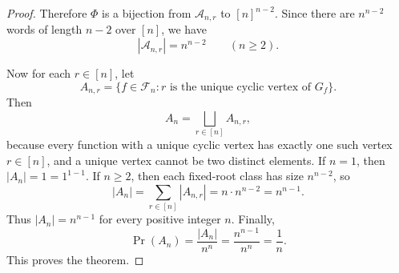 \documentclass[11pt]{article}
\begin{document}
\begin{proof}
Therefore \(\Phi\) is a bijection from \(\mathcal A_{n,r}\) to \([n]^{n-2}\).
Since there are \(n^{n-2}\) words of length \(n-2\) over \([n]\), we have
\[
|\mathcal A_{n,r}|=n^{n-2}\qquad(n\ge2).
\]

Now for each \(r\in[n]\), let
\[
A_{n,r}=\{f\in\mathcal F_n: r\text{ is the unique cyclic vertex of }G_f\}.
\]
Then
\[
A_n=\bigsqcup_{r\in[n]}A_{n,r},
\]
because every function with a unique cyclic vertex has exactly one such vertex
\(r\in[n]\), and a unique vertex cannot be two distinct elements. If \(n=1\),
then \(|A_n|=1=1^{1-1}\). If \(n\ge2\), then each fixed-root class has size
\(n^{n-2}\), so
\[
|A_n|=\sum_{r\in[n]}|A_{n,r}|=n\cdot n^{n-2}=n^{n-1}.
\]
Thus \(|A_n|=n^{n-1}\) for every positive integer \(n\). Finally,
\[
\Pr(A_n)=\frac{|A_n|}{n^n}
=\frac{n^{n-1}}{n^n}
=\frac1n.
\]
This proves the theorem.
\end{proof}
\end{document}
